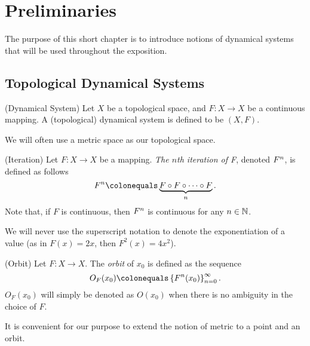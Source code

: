 \documentclass[10pt,twoside,draft]{book}
\begin{document}
\chapter{Preliminaries}
\label{chap:prelim}
The purpose of this short chapter is to introduce notions of dynamical systems that will be used throughout the exposition.

\section{Topological Dynamical Systems}
\begin{definition}
  (Dynamical System)
  Let $X$ be a topological space, and $F: X \to X$ be a continuous mapping.
  A (topological) dynamical system is defined to be $(X, F)$.
\end{definition}
\begin{remark}
  We will often use a metric space as our topological space.
\end{remark}
%
\begin{definition}
  (Iteration)
  Let $F: X \to X$ be a mapping.
  \textit{The $n$th iteration of F}, denoted $F^{n}$, is defined as follows
  \begin{equation*}
    \itr{F}{n} \ceq \underbrace{F \circ F \circ \cdots \circ F}_{n} .
  \end{equation*}
  Note that, if $F$ is continuous, then $F^{n}$ is continuous for any $n \in \mathbb{N}$.
\end{definition}
\begin{remark}
  We will never use the superscript notation to denote the exponentiation of a value (as in $F(x) = 2x$, then $F^2(x) = 4x^2$).
\end{remark}
\begin{definition}
  (Orbit)
  Let $F: X \to X$. 
  The \textit{orbit} of $x_0$ is defined as the sequence
  \begin{equation*}
    O_F(x_0) \ceq \seq{\itr{F}{n}(x_0)}{\infty}{n = 0}.
  \end{equation*}
  $O_F(x_0)$ will simply be denoted as $O(x_0)$ when there is no ambiguity in the choice of $F$.
  \label{def:orbit}
\end{definition}
It is convenient for our purpose to extend the notion of metric to a point and an orbit.
\end{document}
